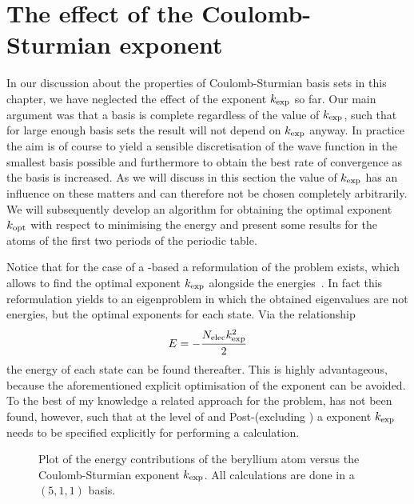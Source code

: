 \pagebreak
\section{The effect of the Coulomb-Sturmian exponent}
\label{sec:kexp}
%

In our discussion about the properties of Coulomb-Sturmian basis sets
in this chapter,
we have neglected the effect of the \CS exponent $\kexp$ so far.
Our main argument was that a \CS basis is complete regardless of the
value of $\kexp$,
such that for large enough \CS basis sets
the result will not depend on $\kexp$ anyway.
In practice the aim is of course to yield a sensible
discretisation of the wave function in the smallest basis possible
and furthermore to obtain the best rate of convergence as the basis is increased.
As we will discuss in this section the value of $\kexp$
has an influence on these matters
and can therefore not be chosen completely arbitrarily.
We will subsequently develop an algorithm for obtaining the optimal exponent $k_\text{opt}$
with respect to minimising the \HF energy
and present some results for the atoms of the first two periods
of the periodic table.

Notice that for the case of a \CS-based \FCI a reformulation of the \FCI problem exists,
which allows to find the optimal exponent $\kexp$
alongside the \FCI energies~\cite{Avery2006}.
In fact this reformulation yields to an eigenproblem
in which the obtained eigenvalues are not energies, but the optimal \CS exponents
for each \FCI state. Via the relationship
\[ E = - \frac{N_\text{elec} k_\text{exp}^2}{2} \]
the energy of each state can be found thereafter.
This is highly advantageous, because the aforementioned explicit
optimisation of the exponent can be avoided.
To the best of my knowledge a related approach for the \HF problem,
has not been found, however,
such that at the level of \HF and Post-\HF (excluding \FCI)
a \CS exponent $\kexp$ needs to be specified explicitly
for performing a calculation.

\begin{figure}
	\centering
	\caption[
		Plot of the \HF energy contributions
		versus the \CS exponent $\kexp$
	]{
		Plot of the \HF energy contributions
		of the beryllium
		atom versus the Coulomb-Sturmian exponent $\kexp$.
		All calculations are done in a $(5,1,1)$ \CS basis.
	}
	\label{fig:EnergyTermsVsK}
\end{figure}

